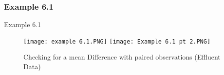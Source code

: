 \documentclass[8pt]{beamer}
\begin{document}
\subsubsection{Example 6.1}
    \begin{frame}{Example 6.1} 
        \begin{figure}
            \texttt{[image: example 6.1.PNG]}
            \texttt{[image: Example 6.1 pt 2.PNG]}
            \caption{Checking for a mean Difference with paired observations (Effluent Data)}
        \end{figure}
    \end{frame}
    
\end{document}
